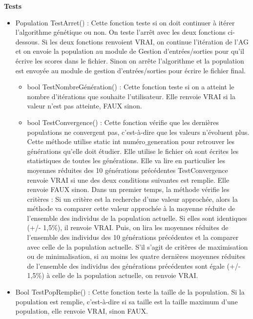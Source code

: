 \documentclass[a4paper,11pt]{article}
\begin{document}
			\textbf{Tests}
				\begin{itemize}
							\item Population TestArret() :  Cette fonction teste si on doit continuer à itérer l’algorithme génétique ou non. 
								On teste l’arrêt avec les deux fonctions ci-dessous. 
								Si les deux fonctions renvoient VRAI, on continue l’itération de l’AG et on envoie la population au module de Gestion d’entrées/sorties pour qu’il écrive les scores dans le fichier. 
								Sinon on arrête l'algorithme et la population est envoyée au module de gestion d’entrées/sorties pour écrire le fichier final.\vspace{0.2cm}
								\begin{itemize}
								\item bool TestNombreGénération() : Cette fonction teste si on a atteint le nombre d’itérations que souhaite l’utilisateur.
									Elle renvoie VRAI si la valeur n’est pas atteinte, FAUX sinon.\vspace{0.2cm}
								\item bool TestConvergence() : Cette fonction vérifie que les dernières populations ne convergent pas, c'est-à-dire que les valeurs n'évoluent plus.
									Cette méthode utilise static int numéro$\_$generation pour retrouver les générations qu'elle doit étudier. Elle utilise le fichier où sont écrites les statistiques de toutes les générations. Elle va lire en particulier les moyennes réduites des 10 générations précédentes
									TestConvergence renvoie VRAI si une des deux conditions suivantes est remplie. Elle renvoie FAUX sinon. 
									Dans un premier temps, la méthode vérifie les critères :
									Si un critère est la recherche d’une valeur approchée, alors la méthode va comparer cette valeur approchée à la moyenne réduite de l’ensemble des individus de la population actuelle. Si elles sont identiques (+/- 1,5$\%$), il renvoie VRAI. Puis, on lira les moyennes réduites de l’ensemble des individus  des 10 générations précédentes et la comparer avec celle de la population actuelle.
									S’il s’agit de critères de maximisation ou de minimalisation, si au moins les quatre dernières moyennes réduites de l’ensemble des individus des générations précédentes sont égale (+/- 1,5$\%$) à celle de la population actuelle, on renvoie VRAI. \vspace{0.2cm}
								\end{itemize}
							
							\item Bool TestPopRemplie() : Cette fonction teste la taille de la population. Si la population est remplie, c’est-à-dire si sa taille est la taille maximum d’une population, elle renvoie VRAI, sinon FAUX.\vspace{0.2cm}
					
					\end{itemize}
				
\end{document}
